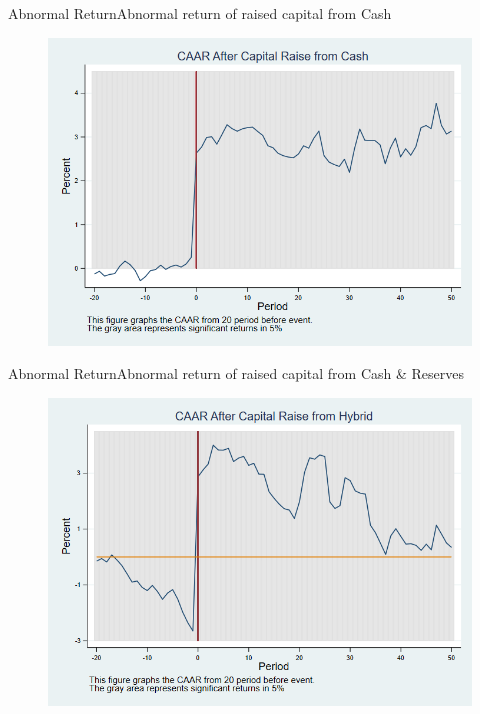 \documentclass{beamer}
\begin{document}
	
	\begin{frame}{Abnormal Return}{Abnormal return of raised capital from Cash}
		\label{car_industryCash}
		\begin{figure}
			\centering
			\includegraphics[width=0.65\linewidth]{Output/car_industryCash.png}
			\label{fig:car_industryCash}
		\end{figure}
		
	\end{frame}
	
	\begin{frame}{Abnormal Return}{Abnormal return of raised capital from Cash \& Reserves}
		\label{car_industryHybrid}
		\begin{figure}
			\centering
			\includegraphics[width=0.65\linewidth]{Output/car_industryHybrid.png}
			\label{fig:car_industryHybrid}
		\end{figure}
	\end{frame}
	
	
	
\end{document}

